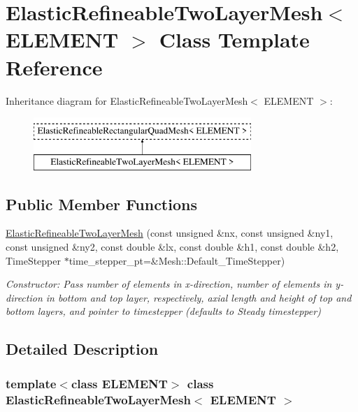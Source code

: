 \hypertarget{classElasticRefineableTwoLayerMesh}{}\section{Elastic\+Refineable\+Two\+Layer\+Mesh$<$ E\+L\+E\+M\+E\+NT $>$ Class Template Reference}
\label{classElasticRefineableTwoLayerMesh}
Inheritance diagram for Elastic\+Refineable\+Two\+Layer\+Mesh$<$ E\+L\+E\+M\+E\+NT $>$\+:\begin{figure}[H]
\begin{center}
\leavevmode
\includegraphics[height=2.000000cm]{classElasticRefineableTwoLayerMesh}
\end{center}
\end{figure}
\subsection*{Public Member Functions}
\begin{DoxyCompactItemize}
\item 
\hyperlink{classElasticRefineableTwoLayerMesh_a868e53937a6cd94e2ff252fe2002a216}{Elastic\+Refineable\+Two\+Layer\+Mesh} (const unsigned \&nx, const unsigned \&ny1, const unsigned \&ny2, const double \&lx, const double \&h1, const double \&h2, Time\+Stepper $\ast$time\+\_\+stepper\+\_\+pt=\&Mesh\+::\+Default\+\_\+\+Time\+Stepper)
\begin{DoxyCompactList}\small\item\em Constructor\+: Pass number of elements in x-\/direction, number of elements in y-\/direction in bottom and top layer, respectively, axial length and height of top and bottom layers, and pointer to timestepper (defaults to Steady timestepper) \end{DoxyCompactList}\end{DoxyCompactItemize}


\subsection{Detailed Description}
\subsubsection*{template$<$class E\+L\+E\+M\+E\+NT$>$\newline
class Elastic\+Refineable\+Two\+Layer\+Mesh$<$ E\+L\+E\+M\+E\+N\+T $>$}

